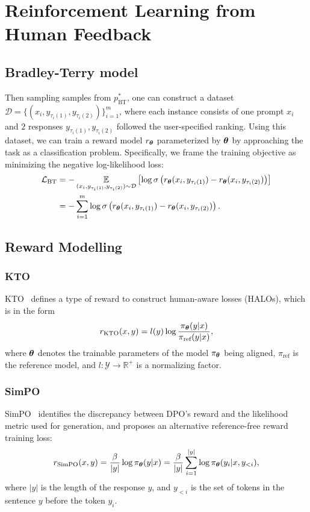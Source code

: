 \section{Reinforcement Learning from Human Feedback}
\label{sec:appendixa}
\subsection{Bradley-Terry model}
\label{sec:btloss}
Then sampling samples from  $p_{\text{BT}}^*$, one can construct a dataset $\mathcal{D}=\{(x_{i}, y_{\tau_{i}(1)}, y_{\tau_{i}(2)})\}_{i=1}^m$, where each instance consists of one prompt $x_{i}$ and $2$ responses $y_{\tau_{i}(1)}, y_{\tau_{i}(2)}$ followed the user-specified ranking. Using this dataset, we can train a reward model $r_{{\boldsymbol{\theta}}}$ parameterized by ${\boldsymbol{\theta}}$ by approaching the task as a classification problem. Specifically, we frame the training objective as minimizing the negative log-likelihood loss:
\begin{equation}
\begin{aligned}
\label{eq:BT_loss}
\mathcal{L}_{\text{BT}} & = -\operatorname*{\mathbb{E}}_{(x_{i}, y_{\tau_{i}(1)}, y_{\tau_{i}(2)})\sim\mathcal{D}}\left[\log\sigma\left(r_{{\boldsymbol{\theta}}}(x_{i}, y_{\tau_{i}(1)})- r_{{\boldsymbol{\theta}}}(x_{i}, y_{\tau_{i}(2)})\right)\right] \\
& =-\sum_{i=1}^m  \log \sigma\left(r_{{\boldsymbol{\theta}}}(x_{i}, y_{\tau_{i}(1)})- r_{{\boldsymbol{\theta}}}(x_{i}, y_{\tau_{i}(2)})\right).
\end{aligned}
\end{equation}

\subsection{Reward Modelling}
\label{sec:rm}
\subsubsection{KTO}
KTO~\cite{kto} defines a type of reward to construct human-aware losses (HALOs), which is in the form 
\begin{equation}
    r_{\text{KTO}}(x, y) = l(y) \log \frac{\pi_{{\boldsymbol{\theta}}}(y|x)}{\pi_{\text{ref}}(y|x)},
\end{equation}
where \( {\boldsymbol{\theta}} \) denotes the trainable parameters of the model \( \pi_{\boldsymbol{\theta}} \) being aligned, \( \pi_{\text{ref}} \) is the reference model, and \( l : \mathcal{Y} \to \mathbb{R}^+ \) is a normalizing factor.

\subsubsection{SimPO}
SimPO~\cite{simpo} identifies the discrepancy between DPO’s reward and the likelihood metric used for generation, and proposes an alternative reference-free reward training loss:
	\begin{equation}
		r_{\text{SimPO}}(x,y)=\frac{\beta}{|y|}\log \pi_{{\boldsymbol{\theta}}}(y|x)=\frac{\beta}{|y|}\sum\limits^{|y|}_{i=1}\log \pi_{{\boldsymbol{\theta}}}(y_{i}|x,y_{<i}),
	\end{equation}
where $|y|$ is the length of the response $y$,  and $y_{<i}$ is the set of tokens in the sentence $y$ before the token $y_{i}$.

